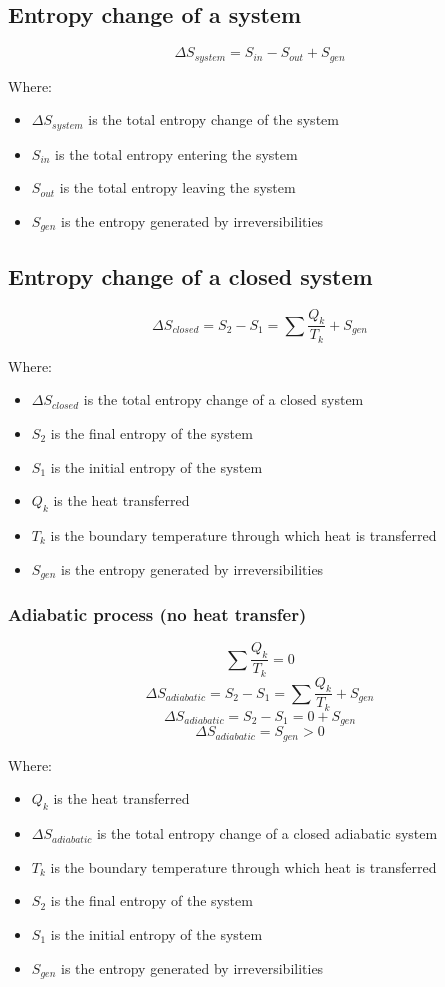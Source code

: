 \documentclass[11pt]{article}
\begin{document}
\subsection{Entropy change of a system}
\label{sec:org4a399eb}
\[\Delta S_{system} = S_{in} - S_{out} + S_{gen}\]

Where:
\begin{itemize}
\item \(\Delta S_{system}\) is the total entropy change of the system
\item \(S_{in}\) is the total entropy entering the system
\item \(S_{out}\) is the total entropy leaving the system
\item \(S_{gen}\) is the entropy generated by irreversibilities
\end{itemize}

 \newpage
\subsection{Entropy change of a closed system}
\label{sec:org0e9bad8}
\[\Delta S_{closed} = S_2 - S_1 = \sum \frac{Q_k}{T_k} + S_{gen}\]

Where:
\begin{itemize}
\item \(\Delta S_{closed}\) is the total entropy change of a closed system
\item \(S_2\) is the final entropy of the system
\item \(S_1\) is the initial entropy of the system
\item \(Q_k\) is the heat transferred
\item \(T_k\) is the boundary temperature through which heat is transferred
\item \(S_{gen}\) is the entropy generated by irreversibilities
\end{itemize}
\subsubsection{Adiabatic process (no heat transfer)}
\label{sec:org26b5196}
\[\sum \frac{Q_k}{T_k} = 0\]
\[\Delta S_{adiabatic} = S_2 - S_1 = \sum \frac{Q_k}{T_k} + S_{gen}\]
\[\Delta S_{adiabatic} = S_2 - S_1 = 0 + S_{gen}\]
\[\Delta S_{adiabatic} = S_{gen} > 0\]

Where:
\begin{itemize}
\item \(Q_k\) is the heat transferred
\item \(\Delta S_{adiabatic}\) is the total entropy change of a closed adiabatic system
\item \(T_k\) is the boundary temperature through which heat is transferred
\item \(S_2\) is the final entropy of the system
\item \(S_1\) is the initial entropy of the system
\item \(S_{gen}\) is the entropy generated by irreversibilities
\end{itemize}
\end{document}
